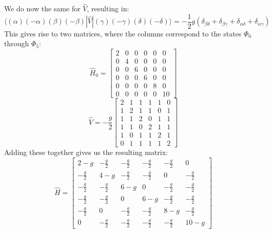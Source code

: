 \documentclass{article}
\begin{document}
We do now the same for $\hat V$, resulting in:
\begin{equation}
    \langle (\alpha) (-\alpha) (\beta) (-\beta)| \hat V | (\gamma) (-\gamma) (\delta) (-\delta) \rangle = - \frac{1}{2} g (\delta_{\beta \delta} + \delta_{\beta \gamma} + \delta_{\alpha \delta} + \delta_{\alpha \gamma} )
\end{equation}
This gives rise to two matrices, where the columns correspond to the states $\Phi_0$ through $\Phi_5$:
\begin{equation*}
\hat H_0 = 
    \begin{bmatrix}
        2 & 0 & 0 & 0 & 0 & 0 \\
        0 & 4 & 0 & 0 & 0 & 0 \\
        0 & 0 & 6 & 0 & 0 & 0 \\
        0 & 0 & 0 & 6 & 0 & 0 \\
        0 & 0 & 0 & 0 & 8 & 0 \\
        0 & 0 & 0 & 0 & 0 & 10
    \end{bmatrix}
\end{equation*}
\begin{equation*}
\hat V = -\frac{g}{2}
    \begin{bmatrix}
        2 & 1 & 1 & 1 & 1 & 0 \\
        1 & 2 & 1 & 1 & 0 & 1 \\
        1 & 1 & 2 & 0 & 1 & 1 \\
        1 & 1 & 0 & 2 & 1 & 1 \\
        1 & 0 & 1 & 1 & 2 & 1 \\
        0 & 1 & 1 & 1 & 1 & 2
    \end{bmatrix}
\end{equation*}
Adding these together gives us the resulting matrix:
\begin{equation}
    \hat H = 
    \begin{bmatrix}
        2 - g & -\frac{g}{2} & -\frac{g}{2} & -\frac{g}{2} & -\frac{g}{2} & 0 \\
        -\frac{g}{2} & 4 - g & -\frac{g}{2} & -\frac{g}{2} & 0 & -\frac{g}{2} \\
        -\frac{g}{2} & -\frac{g}{2} & 6 - g & 0 & -\frac{g}{2} & -\frac{g}{2} \\
        -\frac{g}{2} & -\frac{g}{2} & 0 & 6 - g & -\frac{g}{2} & -\frac{g}{2} \\
        -\frac{g}{2} & 0 & -\frac{g}{2} & -\frac{g}{2} & 8 - g & -\frac{g}{2} \\
        0 & -\frac{g}{2} & -\frac{g}{2} & -\frac{g}{2} & -\frac{g}{2} & 10 - g
    \end{bmatrix}
\end{equation}
\end{document}
